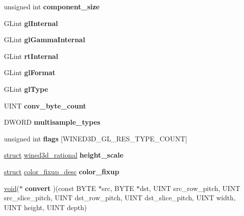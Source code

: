 \begin{DoxyCompactItemize}
\item 
\mbox{\label{structwined3d__format_a198f2f762ff2697f76850587338a8d97}} 
unsigned int {\bfseries component\+\_\+size}
\item 
\mbox{\label{structwined3d__format_a413f401a0561c0943a5507a117648a5d}} 
G\+Lint {\bfseries gl\+Internal}
\item 
\mbox{\label{structwined3d__format_a958ad64c841bfc550077f954b0109c04}} 
G\+Lint {\bfseries gl\+Gamma\+Internal}
\item 
\mbox{\label{structwined3d__format_a6342673271d47e880f8091233748c71b}} 
G\+Lint {\bfseries rt\+Internal}
\item 
\mbox{\label{structwined3d__format_afc0673f74894f23bcd78d55a6af224cf}} 
G\+Lint {\bfseries gl\+Format}
\item 
\mbox{\label{structwined3d__format_a0e12cd885ad397707912ac21572659f0}} 
G\+Lint {\bfseries gl\+Type}
\item 
\mbox{\label{structwined3d__format_a92293f056eb38694dd189bf54c17a5cd}} 
U\+I\+NT {\bfseries conv\+\_\+byte\+\_\+count}
\item 
\mbox{\label{structwined3d__format_af093a64bf86c1eac5c09a006bd40b9ac}} 
D\+W\+O\+RD {\bfseries multisample\+\_\+types}
\item 
\mbox{\label{structwined3d__format_a1baedd62462841b8f06fc3d53ae7a243}} 
unsigned int {\bfseries flags} \mbox{[}W\+I\+N\+E\+D3\+D\+\_\+\+G\+L\+\_\+\+R\+E\+S\+\_\+\+T\+Y\+P\+E\+\_\+\+C\+O\+U\+NT\mbox{]}
\item 
\mbox{\label{structwined3d__format_a0fc53282fc4b1d4f78ec9aceafe16dd3}} 
\hyperlink{interfacestruct}{struct} \hyperlink{structwined3d__rational}{wined3d\+\_\+rational} {\bfseries height\+\_\+scale}
\item 
\mbox{\label{structwined3d__format_afc40bc085791330609fe043092605e2c}} 
\hyperlink{interfacestruct}{struct} \hyperlink{structcolor__fixup__desc}{color\+\_\+fixup\+\_\+desc} {\bfseries color\+\_\+fixup}
\item 
\mbox{\label{structwined3d__format_ac124bc7cf7e254188378f772f8776c2e}} 
\hyperlink{interfacevoid}{void}($\ast$ {\bfseries convert} )(const B\+Y\+TE $\ast$src, B\+Y\+TE $\ast$dst, U\+I\+NT src\+\_\+row\+\_\+pitch, U\+I\+NT src\+\_\+slice\+\_\+pitch, U\+I\+NT dst\+\_\+row\+\_\+pitch, U\+I\+NT dst\+\_\+slice\+\_\+pitch, U\+I\+NT width, U\+I\+NT height, U\+I\+NT depth)
\end{DoxyCompactItemize}


